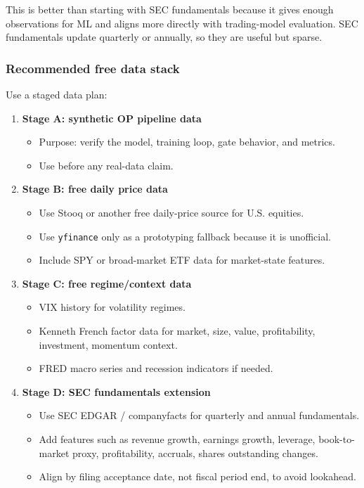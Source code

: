 This is better than starting with SEC fundamentals because it gives
enough observations for ML and aligns more directly with trading-model
evaluation. SEC fundamentals update quarterly or annually, so they are
useful but sparse.

\subsubsection{Recommended free data
stack}\label{recommended-free-data-stack}

Use a staged data plan:

\begin{enumerate}
\def\labelenumi{\arabic{enumi}.}
\tightlist
\item
  \textbf{Stage A: synthetic OP pipeline data}

  \begin{itemize}
  \tightlist
  \item
    Purpose: verify the model, training loop, gate behavior, and
    metrics.
  \item
    Use before any real-data claim.
  \end{itemize}
\item
  \textbf{Stage B: free daily price data}

  \begin{itemize}
  \tightlist
  \item
    Use Stooq or another free daily-price source for U.S. equities.
  \item
    Use \texttt{yfinance} only as a prototyping fallback because it is
    unofficial.
  \item
    Include SPY or broad-market ETF data for market-state features.
  \end{itemize}
\item
  \textbf{Stage C: free regime/context data}

  \begin{itemize}
  \tightlist
  \item
    VIX history for volatility regimes.
  \item
    Kenneth French factor data for market, size, value, profitability,
    investment, momentum context.
  \item
    FRED macro series and recession indicators if needed.
  \end{itemize}
\item
  \textbf{Stage D: SEC fundamentals extension}

  \begin{itemize}
  \tightlist
  \item
    Use SEC EDGAR / companyfacts for quarterly and annual fundamentals.
  \item
    Add features such as revenue growth, earnings growth, leverage,
    book-to-market proxy, profitability, accruals, shares outstanding
    changes.
  \item
    Align by filing acceptance date, not fiscal period end, to avoid
    lookahead.
  \end{itemize}
\end{enumerate}

